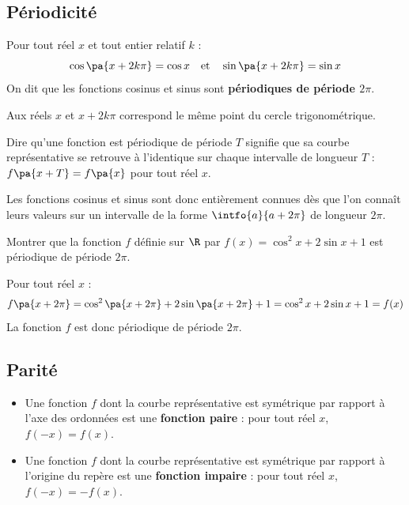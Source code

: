 \subsection{Périodicité}

\begin{prop}
	Pour tout réel $x$ et tout entier relatif $k$ :
	\[
		\cos\pa{x + 2k\pi} = \cos x \quad\text{et}\quad \sin\pa{x + 2k\pi} = \sin x
	\]
	On dit que les fonctions cosinus et sinus sont \textbf{périodiques de période $2\pi$}.
\end{prop}

\begin{demo}
	Aux réels $x$ et $x + 2k\pi$ correspond le même point du cercle trigonométrique.
\end{demo}

\begin{rem}
	Dire qu'une fonction est périodique de période $T$ signifie que sa courbe représentative se retrouve à l'identique sur chaque intervalle de longueur $T$ : $f\pa{x + T} = f\pa{x}$ pour tout réel $x$.

	Les fonctions cosinus et sinus sont donc entièrement connues dès que l'on connaît leurs valeurs sur un intervalle de la forme $\intfo{a}{a + 2\pi}$ de longueur $2\pi$.
\end{rem}

\begin{methode}
	Montrer que la fonction $f$ définie sur $\R$ par $f(x) = \cos^2 x + 2\sin x + 1$ est périodique de période $2\pi$.

	\begin{correction}
		Pour tout réel $x$ :
		\[
			f\pa{x + 2\pi} = \cos^2\pa{x + 2\pi} + 2\sin\pa{x + 2\pi} + 1 = \cos^2 x + 2\sin x + 1 = f(x)
		\]
		La fonction $f$ est donc périodique de période $2\pi$.
	\end{correction}
\end{methode}

\subsection{Parité}

\begin{defin}
	\nline
	\begin{itemize}
		\item Une fonction $f$ dont la courbe représentative est symétrique par rapport à l'axe des ordonnées est une \textbf{fonction paire} : pour tout réel $x$, $f(-x) = f(x)$.
		\item Une fonction $f$ dont la courbe représentative est symétrique par rapport à l'origine du repère est une \textbf{fonction impaire} : pour tout réel $x$, $f(-x) = -f(x)$.
	\end{itemize}
\end{defin}

